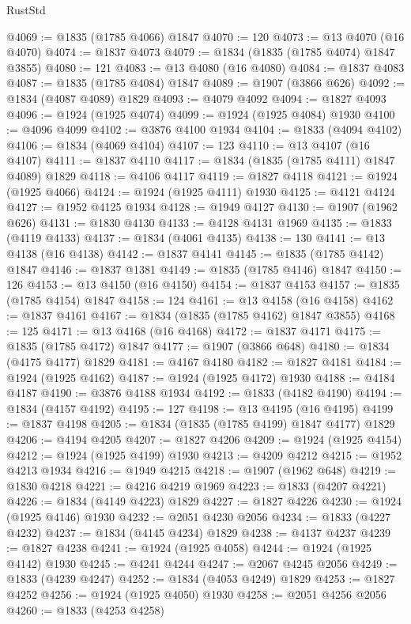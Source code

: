 \begin{lexlean}{RustStd}
\begin{coremodule}
@4069 := @1835 (@1785 @4066) @1847
@4070 := 120
@4073 := @13 @4070 (@16 @4070)
@4074 := @1837 @4073
@4079 := @1834 (@1835 (@1785 @4074) @1847 @3855)
@4080 := 121
@4083 := @13 @4080 (@16 @4080)
@4084 := @1837 @4083
@4087 := @1835 (@1785 @4084) @1847
@4089 := @1907 (@3866 @626)
@4092 := @1834 (@4087 @4089) @1829
@4093 := @4079 @4092
@4094 := @1827 @4093
@4096 := @1924 (@1925 @4074)
@4099 := @1924 (@1925 @4084) @1930
@4100 := @4096 @4099
@4102 := @3876 @4100 @1934
@4104 := @1833 (@4094 @4102)
@4106 := @1834 (@4069 @4104)
@4107 := 123
@4110 := @13 @4107 (@16 @4107)
@4111 := @1837 @4110
@4117 := @1834 (@1835 (@1785 @4111) @1847 @4089) @1829
@4118 := @4106 @4117
@4119 := @1827 @4118
@4121 := @1924 (@1925 @4066)
@4124 := @1924 (@1925 @4111) @1930
@4125 := @4121 @4124
@4127 := @1952 @4125 @1934
@4128 := @1949 @4127
@4130 := @1907 (@1962 @626)
@4131 := @1830 @4130
@4133 := @4128 @4131 @1969
@4135 := @1833 (@4119 @4133)
@4137 := @1834 (@4061 @4135)
@4138 := 130
@4141 := @13 @4138 (@16 @4138)
@4142 := @1837 @4141
@4145 := @1835 (@1785 @4142) @1847
@4146 := @1837 @1381
@4149 := @1835 (@1785 @4146) @1847
@4150 := 126
@4153 := @13 @4150 (@16 @4150)
@4154 := @1837 @4153
@4157 := @1835 (@1785 @4154) @1847
@4158 := 124
@4161 := @13 @4158 (@16 @4158)
@4162 := @1837 @4161
@4167 := @1834 (@1835 (@1785 @4162) @1847 @3855)
@4168 := 125
@4171 := @13 @4168 (@16 @4168)
@4172 := @1837 @4171
@4175 := @1835 (@1785 @4172) @1847
@4177 := @1907 (@3866 @648)
@4180 := @1834 (@4175 @4177) @1829
@4181 := @4167 @4180
@4182 := @1827 @4181
@4184 := @1924 (@1925 @4162)
@4187 := @1924 (@1925 @4172) @1930
@4188 := @4184 @4187
@4190 := @3876 @4188 @1934
@4192 := @1833 (@4182 @4190)
@4194 := @1834 (@4157 @4192)
@4195 := 127
@4198 := @13 @4195 (@16 @4195)
@4199 := @1837 @4198
@4205 := @1834 (@1835 (@1785 @4199) @1847 @4177) @1829
@4206 := @4194 @4205
@4207 := @1827 @4206
@4209 := @1924 (@1925 @4154)
@4212 := @1924 (@1925 @4199) @1930
@4213 := @4209 @4212
@4215 := @1952 @4213 @1934
@4216 := @1949 @4215
@4218 := @1907 (@1962 @648)
@4219 := @1830 @4218
@4221 := @4216 @4219 @1969
@4223 := @1833 (@4207 @4221)
@4226 := @1834 (@4149 @4223) @1829
@4227 := @1827 @4226
@4230 := @1924 (@1925 @4146) @1930
@4232 := @2051 @4230 @2056
@4234 := @1833 (@4227 @4232)
@4237 := @1834 (@4145 @4234) @1829
@4238 := @4137 @4237
@4239 := @1827 @4238
@4241 := @1924 (@1925 @4058)
@4244 := @1924 (@1925 @4142) @1930
@4245 := @4241 @4244
@4247 := @2067 @4245 @2056
@4249 := @1833 (@4239 @4247)
@4252 := @1834 (@4053 @4249) @1829
@4253 := @1827 @4252
@4256 := @1924 (@1925 @4050) @1930
@4258 := @2051 @4256 @2056
@4260 := @1833 (@4253 @4258)

\end{coremodule}
\end{lexlean}
